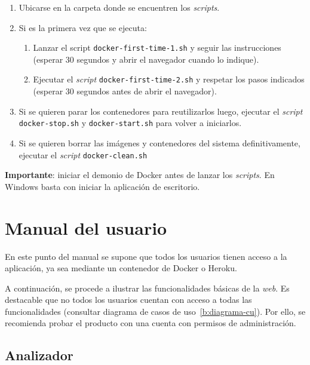 \begin{enumerate}
	\item Ubicarse en la carpeta donde se encuentren los \textit{scripts}.
	\item Si es la primera vez que se ejecuta:
	\begin{enumerate}
	\item Lanzar el script \texttt{docker-first-time-1.sh} y seguir las instrucciones (esperar 30 segundos y abrir el navegador cuando lo indique).
	\item Ejecutar el \textit{script} \texttt{docker-first-time-2.sh} y respetar los pasos indicados (esperar 30 segundos antes de abrir el navegador).
	\end{enumerate}
	\item Si se quieren parar los contenedores para reutilizarlos luego, ejecutar el \textit{script} \texttt{docker-stop.sh} y \texttt{docker-start.sh} para volver a iniciarlos.
	\item Si se quieren borrar las imágenes y contenedores del sistema definitivamente, ejecutar el \textit{script} \texttt{docker-clean.sh}
\end{enumerate}

\textbf{Importante}: iniciar el demonio de Docker antes de lanzar los \textit{scripts}. En Windows basta con iniciar la aplicación de escritorio.

\section{Manual del usuario}

En este punto del manual se supone que todos los usuarios tienen acceso a la aplicación, ya sea mediante un contenedor de Docker o Heroku.

A continuación, se procede a ilustrar las funcionalidades básicas de la \textit{web}. Es destacable que no todos los usuarios cuentan con acceso a todas las funcionalidades (consultar diagrama de casos de uso~\ref{b:diagrama-cu}). Por ello, se recomienda probar el producto con una cuenta con permisos de administración.


\subsection{Analizador}

